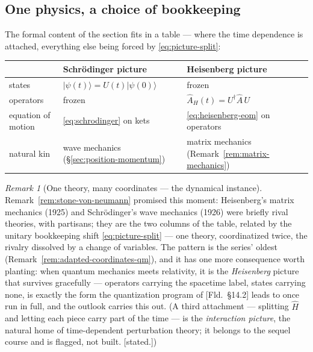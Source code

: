 \documentclass[11pt]{article}
\theoremstyle{plain}
\theoremstyle{definition}
\theoremstyle{remark}
\newtheorem{remark}[theorem]{Remark}
\newcommand{\op}[1]{\hat{#1}}
\newcommand{\ket}[1]{\lvert #1 \rangle}
\begin{document}
\subsection{One physics, a choice of bookkeeping}
\label{sec:pictures-remark}

The formal content of the section fits in a table --- where the time
dependence is attached, everything else being forced by
\eqref{eq:picture-split}:
\begin{center}
\begin{tabular}{lll}
\toprule
 & Schr\"odinger picture & Heisenberg picture \\
\midrule
states & $\ket{\psi(t)} = U(t)\ket{\psi(0)}$ & frozen \\
operators & frozen & $\op A_H(t) = U^\dagger \op A\, U$ \\
equation of motion & \eqref{eq:schrodinger} on kets &
\eqref{eq:heisenberg-eom} on operators \\
natural kin & wave mechanics (\S\ref{sec:position-momentum}) &
matrix mechanics (Remark~\ref{rem:matrix-mechanics}) \\
\bottomrule
\end{tabular}
\end{center}

\begin{remark}[One theory, many coordinates --- the dynamical
instance]\label{rem:pictures-coordinates}
Remark~\ref{rem:stone-von-neumann} promised this moment: Heisenberg's
matrix mechanics (1925) and Schr\"odinger's wave mechanics (1926)
were briefly rival theories, with partisans; they are the two
columns of the table, related by the unitary bookkeeping shift
\eqref{eq:picture-split} --- one theory, coordinatized twice, the
rivalry dissolved by a change of variables. The pattern is the series'
oldest (Remark~\ref{rem:adapted-coordinates-qm}), and it has one
more consequence worth planting: when quantum mechanics meets
relativity, it is the \emph{Heisenberg} picture that survives
gracefully --- operators carrying the spacetime label, states
carrying none, is exactly the form the quantization program of
[Fld.\ \S14.2] leads to once run in full, and the outlook carries
this out.
(A third attachment --- splitting $\op H$ and letting each piece
carry part of the time --- is the \emph{interaction picture}, the
natural home of time-dependent perturbation theory; it belongs to
the sequel course and is flagged, not built. [stated.])
\end{remark}


\end{document}
